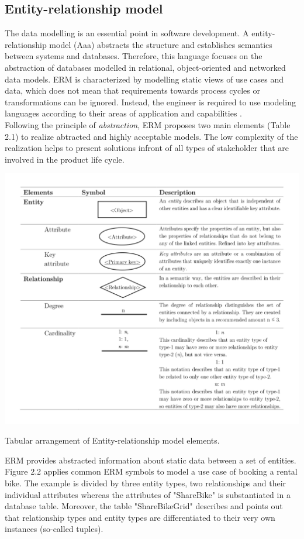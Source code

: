\subsection{Entity-relationship model}
The data modelling is an essential point in software development. A entity-relationship model (\gls{Aaa}) abstracts the structure and establishes semantics between systems and databases. Therefore, this language focuses on the abstraction of databases modelled in relational, object-oriented and networked data models.
ERM is characterized by modelling static views of use cases and data, which does not mean that requirements towards process cycles or transformations can be ignored. Instead, the engineer is required to use modeling languages according to their areas of application and capabilities \cite{Bernroider.2006}. \\
Following the principle of \textit{abstraction}, ERM proposes two main elements (Table 2.1) to realize abtracted and highly acceptable models. The low complexity of the realization helps to present solutions infront of all types of stakeholder that are involved in the product life cycle.
\begin{table}[!hb]
	\centering
	\label{tbl:TableLatexShortened}
	\includegraphics[scale=0.3]{TableLatexShortened}
	\caption{Tabular arrangement of Entity-relationship model elements.}
\end{table}


ERM provides abstracted information about static data between a set of entities. Figure 2.2 applies common ERM symbols to model a use case of booking a rental bike. The example is divided by three entity types, two relationships and their individual attributes whereas the attributes of "ShareBike" is substantiated in a database table. Moreover, the table "ShareBikeGrid" describes and points out that relationship types and entity types are differentiated to their very own instances (so-called tuples). \\


